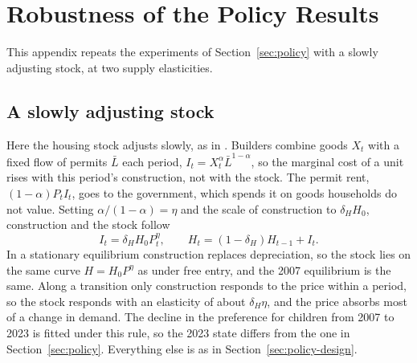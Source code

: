 \providecommand{\pend}{\textcolor{red}{[pending]}}
\providecommand{\PRF}{../../output/model/experiments/housing_supply/20261021_paper_results}

\section{Robustness of the Policy Results}
\label{app:policy-robust}

This appendix repeats the experiments of Section~\ref{sec:policy} with a
slowly adjusting stock, at two supply elasticities.

\subsection{A slowly adjusting stock}
\label{app:policy-slow}

Here the housing stock adjusts slowly, as in
\citet{kaplanMitmanViolanteHousing2020}. Builders combine goods $X_t$ with a
fixed flow of permits $\bar L$ each period, $I_t=X_t^{\alpha}\bar L^{1-\alpha}$,
so the marginal cost of a unit rises with this period's construction, not with
the stock. The permit rent, $(1-\alpha)P_tI_t$, goes to the government, which
spends it on goods households do not value. Setting $\alpha/(1-\alpha)=\eta$
and the scale of construction to $\delta_HH_0$, construction and the stock
follow
\begin{equation}
 I_t=\delta_H H_0P_t^{\eta},\qquad H_t=(1-\delta_H)H_{t-1}+I_t .
 \label{eq:app-slow-stock}
\end{equation}
In a stationary equilibrium construction replaces depreciation, so the stock
lies on the same curve $H=H_0P^{\eta}$ as under free entry, and the 2007
equilibrium is the same. Along a transition only construction responds to the
price within a period, so the stock responds with an elasticity of about
$\delta_H\eta$, and the price absorbs most of a change in demand. The decline
in the preference for children from 2007 to 2023 is fitted under this rule, so
the 2023 state differs from the one in Section~\ref{sec:policy}. Everything
else is as in Section~\ref{sec:policy-design}.

